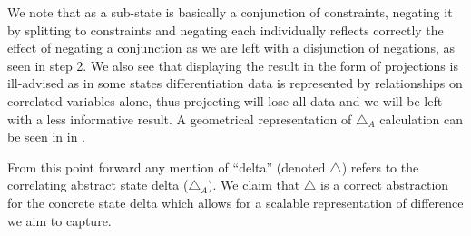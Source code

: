 We note that as a sub-state is basically a conjunction of constraints, negating it by splitting to constraints and negating each individually reflects correctly the effect of negating a conjunction as we are left with a disjunction of negations, as seen in step 2.
We also see that displaying the result in the form of projections is ill-advised as in some states differentiation data is represented by relationships on correlated variables alone, thus projecting will lose all data and we will be left with a less informative result. A geometrical representation of $\triangle_{A}$ calculation can be seen in  in .

%

From this point forward any mention of ``delta'' (denoted $\triangle$) refers to the correlating abstract state delta ($\triangle_{A})$. We claim that $\triangle$ is a correct abstraction for the concrete state delta which allows for a scalable representation of difference we aim to capture.
